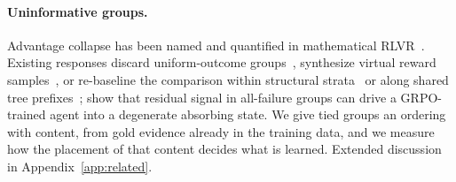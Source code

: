 \paragraph{Uninformative groups.}
Advantage collapse has been named and quantified in mathematical
RLVR~\citep{he2026collapse}. Existing responses discard uniform-outcome
groups~\citep{yu2025dapo,greso2025,xu2026downsampling}, synthesize
virtual reward samples~\citep{he2026collapse}, or re-baseline the
comparison within structural strata~\citep{zhu2025grpo} or along
shared tree prefixes~\citep{Ji2026tree}; \citet{wang2026darkroom} show
that residual signal in all-failure groups can drive a GRPO-trained
agent into a degenerate absorbing state. We give tied groups an
ordering with content, from gold evidence already in the training
data, and we measure how the placement of that content decides what is
learned. Extended discussion in Appendix~\ref{app:related}.

